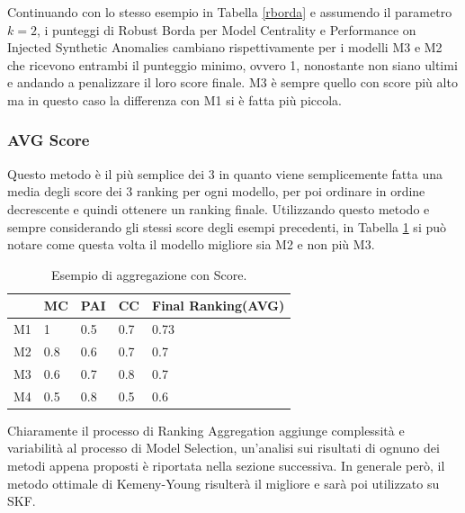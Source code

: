 Continuando con lo stesso esempio in Tabella \ref{rborda} e assumendo il parametro \(k=2\), i punteggi di Robust Borda per Model Centrality e Performance on Injected Synthetic Anomalies cambiano rispettivamente per i modelli M3 e M2 che ricevono entrambi il punteggio minimo, ovvero 1, nonostante non siano ultimi e andando a penalizzare il loro score finale. M3 è sempre quello con score più alto ma in questo caso la differenza con M1 si è fatta più piccola.

\subsubsection{AVG Score}
Questo metodo è il più semplice dei 3 in quanto viene semplicemente fatta una media degli score dei 3 ranking per ogni modello, per poi ordinare in ordine decrescente e quindi ottenere un ranking finale.
Utilizzando questo metodo e sempre considerando gli stessi score degli esempi precedenti, in Tabella \ref{score} si può notare come questa volta il modello migliore sia M2 e non più M3.

\begin{table}
	
	\centering
	\begin{tabular}{|l|l|l|l|l|}
		\hline
		   & MC  & PAI & CC  & Final Ranking(AVG) \\ \hline
		M1 & 1   & 0.5 & 0.7 & 0.73               \\ \hline
		M2 & 0.8 & 0.6 & 0.7 & 0.7                \\ \hline
		M3 & 0.6 & 0.7 & 0.8 & 0.7                \\ \hline
		M4 & 0.5 & 0.8 & 0.5 & 0.6                \\ \hline
	\end{tabular}
	\caption{\label{score}Esempio di aggregazione con Score.}
\end{table}


Chiaramente il processo di Ranking Aggregation aggiunge complessità e variabilità al processo di Model Selection, un'analisi sui risultati di ognuno dei metodi appena proposti è riportata nella sezione successiva. In generale però, il metodo ottimale di Kemeny-Young risulterà il migliore e sarà poi utilizzato su SKF.


